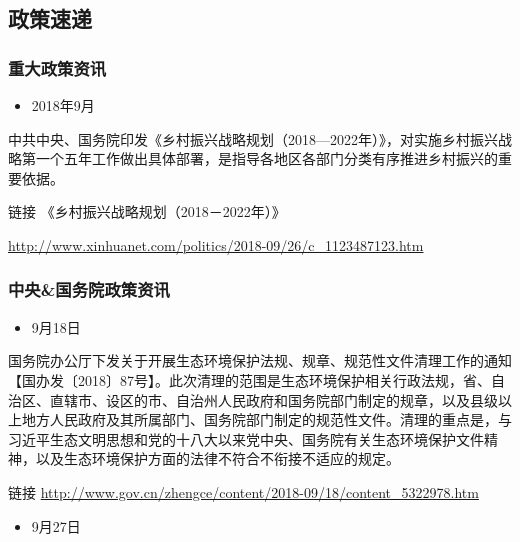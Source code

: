 \documentclass[]{book}
\providecommand{\tightlist}{%
  \setlength{\itemsep}{0pt}\setlength{\parskip}{0pt}}
\begin{document}
\hypertarget{ux653fux7b56ux901fux9012-5}{%
\subsection*{政策速递}\label{ux653fux7b56ux901fux9012-5}}

\hypertarget{ux91cdux5927ux653fux7b56ux8d44ux8baf-5}{%
\subsubsection*{重大政策资讯}\label{ux91cdux5927ux653fux7b56ux8d44ux8baf-5}}

\begin{itemize}
\tightlist
\item
  2018年9月
\end{itemize}

中共中央、国务院印发《乡村振兴战略规划（2018---2022年）》，对实施乡村振兴战略第一个五年工作做出具体部署，是指导各地区各部门分类有序推进乡村振兴的重要依据。

链接 《乡村振兴战略规划（2018－2022年）》

\url{http://www.xinhuanet.com/politics/2018-09/26/c_1123487123.htm}

\hypertarget{ux4e2dux592eux56fdux52a1ux9662ux653fux7b56ux8d44ux8baf-5}{%
\subsubsection*{中央\&国务院政策资讯}\label{ux4e2dux592eux56fdux52a1ux9662ux653fux7b56ux8d44ux8baf-5}}

\begin{itemize}
\tightlist
\item
  9月18日
\end{itemize}

国务院办公厅下发关于开展生态环境保护法规、规章、规范性文件清理工作的通知【国办发〔2018〕87号】。此次清理的范围是生态环境保护相关行政法规，省、自治区、直辖市、设区的市、自治州人民政府和国务院部门制定的规章，以及县级以上地方人民政府及其所属部门、国务院部门制定的规范性文件。清理的重点是，与习近平生态文明思想和党的十八大以来党中央、国务院有关生态环境保护文件精神，以及生态环境保护方面的法律不符合不衔接不适应的规定。

链接 \url{http://www.gov.cn/zhengce/content/2018-09/18/content_5322978.htm}

\begin{itemize}
\tightlist
\item
  9月27日
\end{itemize}
\end{document}
